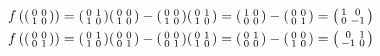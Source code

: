 \begin{solution}
\begin{enumerate}
\begin{alignat*}{1}
            &f\left(\begin{psmallmatrix}0&0\\1&0\end{psmallmatrix}\right) = 
            \begin{psmallmatrix}0&1\\1&0\end{psmallmatrix}\begin{psmallmatrix}0&0\\1&0\end{psmallmatrix} - \begin{psmallmatrix}0&0\\1&0\end{psmallmatrix}\begin{psmallmatrix}0&1\\1&0\end{psmallmatrix} = \begin{psmallmatrix}1&0\\0&0\end{psmallmatrix} - \begin{psmallmatrix}0&0\\0&1\end{psmallmatrix} = \begin{psmallmatrix}1&0\\0&-1\end{psmallmatrix} \\
            &f\left(\begin{psmallmatrix}0&0\\0&1\end{psmallmatrix}\right) = 
            \begin{psmallmatrix}0&1\\1&0\end{psmallmatrix}\begin{psmallmatrix}0&0\\0&1\end{psmallmatrix} - \begin{psmallmatrix}0&0\\0&1\end{psmallmatrix}\begin{psmallmatrix}0&1\\1&0\end{psmallmatrix} = \begin{psmallmatrix}0&1\\0&0\end{psmallmatrix} - \begin{psmallmatrix}0&0\\1&0\end{psmallmatrix} = \begin{psmallmatrix}0&1\\-1&0\end{psmallmatrix}

\end{alignat*}
\end{enumerate}
\end{solution}
